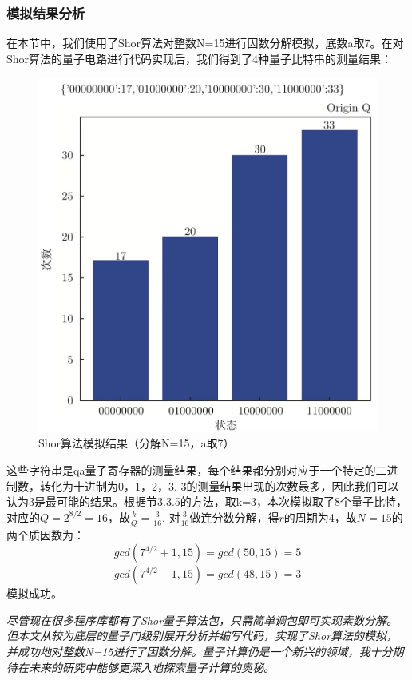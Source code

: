 \documentclass[12pt,hyperref,a4paper,UTF8]{ctexart}
\begin{document}
\subsubsection{模拟结果分析}

在本节中，我们使用了Shor算法对整数N=15进行因数分解模拟，底数a取7。在对Shor算法的量子电路进行代码实现后，我们得到了4种量子比特串的测量结果：
\newpage

\begin{figure}[!htbp]     
    \centering     
    \includegraphics[width =0.7 \textwidth]{figures/结论.jpeg}     
    \caption{Shor算法模拟结果（分解N=15，a取7）}
\end{figure}

\noindent
这些字符串是qa量子寄存器的测量结果，每个结果都分别对应于一个特定的二进制数，转化为十进制为0，1，2，3.
3的测量结果出现的次数最多，因此我们可以认为3是最可能的结果。根据节3.3.5的方法，取k=3，本次模拟取了8个量子比特，对应的$Q=2^{8/2}=16$，故$\frac{k}{Q}=\frac{3}{16}$. 
对$\frac{3}{16}$做连分数分解，得$r$的周期为4，故$N=15$的两个质因数为：
$$
gcd(7^{4/2}+1, 15)=gcd(50, 15)=5
$$
$$
gcd(7^{4/2}-1, 15)=gcd(48, 15)=3
$$
模拟成功。

\vskip 50pt
\textit{尽管现在很多程序库都有了Shor量子算法包，只需简单调包即可实现素数分解。但本文从较为底层的量子门级别展开分析并编写代码，实现了Shor算法的模拟，并成功地对整数N=15进行了因数分解。量子计算仍是一个新兴的领域，我十分期待在未来的研究中能够更深入地探索量子计算的奥秘。}
\end{document}
